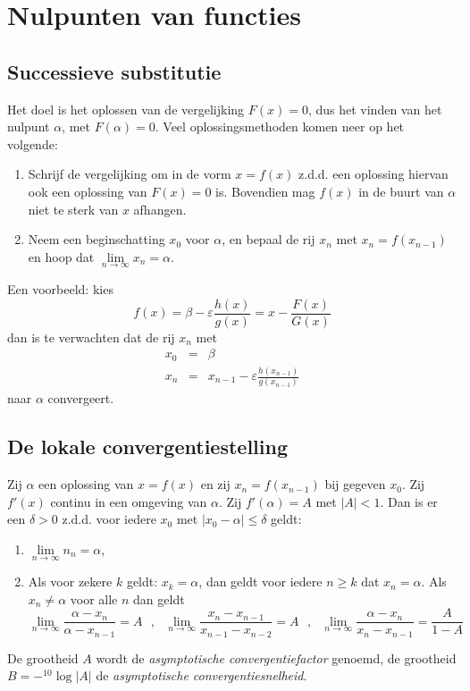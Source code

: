 \section{Nulpunten van functies}
\subsection{Successieve substitutie}
Het doel is het oplossen van de vergelijking $F(x)=0$, dus het vinden van het
nulpunt $\alpha$, met $F(\alpha)=0$.
\npar
Veel oplossingsmethoden komen neer op het volgende:
\begin{enumerate}
\item Schrijf de vergelijking om in de vorm $x=f(x)$ z.d.d. een oplossing
      hiervan ook een oplossing van $F(x)=0$ is. Bovendien mag $f(x)$ in de
      buurt van $\alpha$ niet te sterk van $x$ afhangen.
\item Neem een beginschatting $x_0$ voor $\alpha$, en bepaal de rij $x_n$
      met $x_n=f(x_{n-1})$ en hoop dat $\lim\limits_{n\rightarrow\infty}x_n=\alpha$.
\end{enumerate}
Een voorbeeld: kies
\[
f(x)=\beta-\varepsilon\frac{h(x)}{g(x)}=x-\frac{F(x)}{G(x)}
\]
dan is te verwachten dat de rij $x_n$ met
\begin{eqnarray*}
x_0&=&\beta\\
x_n&=&x_{n-1}-\varepsilon\frac{h(x_{n-1})}{g(x_{n-1})}
\end{eqnarray*}
naar $\alpha$ convergeert.

\subsection{De lokale convergentiestelling}
Zij $\alpha$ een oplossing van $x=f(x)$ en zij $x_n=f(x_{n-1})$ bij gegeven
$x_0$. Zij $f'(x)$ continu in een omgeving van $\alpha$. Zij $f'(\alpha)=A$
met $|A|<1$. Dan is er een $\delta>0$ z.d.d. voor iedere
$x_0$ met $|x_0-\alpha|\leq\delta$ geldt:
\begin{enumerate}
\item $\lim\limits_{n\rightarrow\infty}n_n=\alpha$,
\item Als voor zekere $k$ geldt: $x_k=\alpha$, dan geldt voor iedere $n\geq k$
      dat $x_n=\alpha$. Als $x_n\neq\alpha$ voor alle $n$ dan geldt
\[
\lim_{n\rightarrow\infty}\frac{\alpha-x_n}{\alpha-x_{n-1}}=A~~~,~~~
\lim_{n\rightarrow\infty}\frac{x_n-x_{n-1}}{x_{n-1}-x_{n-2}}=A~~~,~~~
\lim_{n\rightarrow\infty}\frac{\alpha-x_n}{x_n-x_{n-1}}=\frac{A}{1-A}
\]
\end{enumerate}
De grootheid $A$ wordt de {\it asymptotische convergentiefactor} genoemd, de
grootheid $B=-{}^{10}\log|A|$ de {\it asymptotische convergentiesnelheid}.

